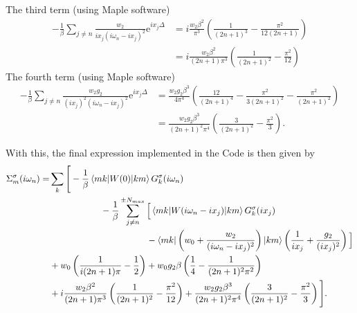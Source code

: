 \documentclass[12pt,a4paper]{scrartcl}
\numberwithin{equation}{section}
\begin{document}
The third term (using Maple software)
\begin{align}
-\frac{1}{\beta} \sum_{j\neq n}  \frac{w_2}{ix_j(i\omega_n -ix_j)^2} \mathrm{e}^{ix_j \Delta} 
&= i\frac{w_2\beta^2}{\pi^3}\left( \frac{1}{(2n+1)^3} - \frac{\pi^2}{12(2n+1)} \right) \\
&= i\frac{w_2\beta^2}{(2n+1)\pi^3}\left( \frac{1}{(2n+1)^2} - \frac{\pi^2}{12} \right) 
\end{align}
The fourth term (using Maple software)
\begin{align}
-\frac{1}{\beta} \sum_{j\neq n}  \frac{w_2g_2}{(ix_j)^2 (i\omega_n -ix_j)^2} \mathrm{e}^{ix_j \Delta} 
&= \frac{w_2g_2\beta^3}{4\pi^4}\left( \frac{12}{(2n+1)^4} - \frac{\pi^2}{3(2n+1)^2} - \frac{\pi^2}{(2n+1)^2} \right) \\
&= \frac{w_2g_2\beta^3}{(2n+1)^2\pi^4}\left( \frac{3}{(2n+1)^2} - \frac{\pi^2}{3} \right).
\end{align}

With this, the final expression implemented in the Code is then given by
\begin{align}
  \Sigma_m^{\sigma}(i\omega_n) 
%
  =& \sum_k\Bigg[ -\frac{1}{\beta} 
   \braket{m k | W(0 )|k m}G^{\sigma}_{k}(i\omega_n) \nonumber \\
%
   & \hspace{2cm}-\frac{1}{\beta}\sum_{j\neq n}^{\pm N_{max}} 
   \Big[ \braket{m k | W(i\omega_n- ix_j ) |k m}  G^{\sigma}_{k}(ix_j) \nonumber \\
%
   &\hspace{3.8cm} -\braket{m k |\left( w_0 + \frac{w_2}{(i\omega_n- ix_j)^2}\right) |k m} 
       \left( \frac{1}{ix_j} + \frac{g_2}{(ix_j)^2} \right)  \Big]\nonumber \\
& +w_0 \left( \frac{1}{i(2n+1)\pi} -\frac{1}{2} \right) 
  + w_0 g_2\beta\left( \frac{1}{4} -\frac{1}{(2n+1)^2\pi^2} \right) \nonumber \\
& + i\frac{w_2\beta^2}{(2n+1)\pi^3}\left( \frac{1}{(2n+1)^2} - \frac{\pi^2}{12} \right) 
  + \frac{w_2g_2\beta^3}{(2n+1)^2\pi^4}\left( \frac{3}{(2n+1)^2} - \frac{\pi^2}{3} \right) \Bigg] .
 \end{align}
 
 
\end{document}

